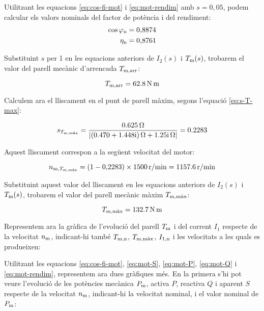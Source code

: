 \begin{exemple}
    Utilitzant les equacions  \eqref{eq:cos-fi-mot} i \eqref{eq:mot-rendim} amb $s  = 0{,}05$, podem calcular els valors nominals del factor de potència i del rendiment:
    \begin{align*}
    	\cos\varphi_\mathrm{n} &=  0{,}8874 \\
    	\eta_\mathrm{n} &=  0{,}8761
    \end{align*}
    
    Substituint $s$ per 1   en les equacions anteriors de $I_2(s)$  i $T_\mathrm{m}(s)$, trobarem el valor del parell mecànic d'arrencada $T_\mathrm{m,arr}$:
    
	\[
		T_\mathrm{m,arr} = \qty{62,8}{N.m}
	\]

    Calculem ara el lliscament en el punt de parell màxim, segons l'equació \eqref{eq:s-T-max}:
    
    \[
        s_{T\ped{m,\text{màx}}} =  \frac{\qty{0,625}{\ohm}}{|\complexqty{0,470+j1,448}{\ohm} + \complexqty{j1,25}{\ohm}|} = \num{0,2283} 
    \]
    
    Aquest lliscament correspon a la següent  velocitat del motor:
    
    \[
    	n_{\text{m},T_\mathrm{m,\text{màx}}} = (1 - 0{,}2283) \times \qty{1500}{r/min} = \qty{1157,6}{r/min}
    \]
    
  Substituint aquest valor del lliscament en les equacions anteriors de $I_2(s)$  i $T_\mathrm{m}(s)$, trobarem el valor del parell mecànic màxim  $T_\mathrm{m,\text{màx}}$:
  
  \[
 	T_\mathrm{m,\text{màx}} = \qty{132,7}{N.m}
  \]


    Representem ara la gràfica de l'evolució del parell $T_\mathrm{m}$ i del corrent $I_1$ respecte de la velocitat $n_\mathrm{m}$, indicant-hi també $T_\mathrm{m,n}$, $T_\mathrm{m,\text{màx}}$, $I_\mathrm{1,n}$ i les velocitats a les quals es produeixen:
    \begin{center}
        \fontsize{10pt}{11pt}\selectfont
        
    \end{center}
	\vspace{-2mm}
	Utilitzant les equacions \eqref{eq:cos-fi-mot}, \eqref{eq:mot-S}, \eqref{eq:mot-P}, \eqref{eq:mot-Q} i \eqref{eq:mot-rendim}, representem ara dues gràfiques més. 	  En la primera s'hi pot veure  l'evolució de les potències mecànica $P_\mathrm{m}$, activa  $P$, reactiva $Q$ i aparent $S$ respecte de la velocitat $n_\mathrm{m}$, indicant-hi  la   velocitat nominal, i el valor nominal de $P_\mathrm{m}$:
	\begin{center}
		\fontsize{10pt}{11pt}\selectfont
		
	\end{center}	
	

\end{exemple}
